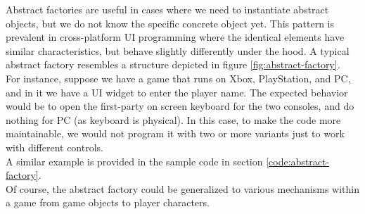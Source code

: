 \begin{multicols}{2}
Abstract factories are useful in cases where we need to instantiate abstract objects, but we do not know the specific concrete object yet\cite{sm-abstract-factory}. This pattern is prevalent in cross-platform UI programming where the identical elements have similar characteristics, but behave slightly differently under the hood. A typical abstract factory resembles a structure depicted in figure \ref{fig:abstract-factory}.\cite{ctan-abstract-factory}\bs
\\
For instance, suppose we have a game that runs on Xbox, PlayStation, and PC, and in it we have a UI widget to enter the player name. The expected behavior would be to open the first-party on screen keyboard for the two consoles, and do nothing for PC (as keyboard is physical). In this case, to make the code more maintainable, we would not program it with two or more variants just to work with different controls.\bs
\\
A similar example is provided in the sample code in section \ref{code:abstract-factory}\cite{sm-abstract-factory-example}.\bs
\\
Of course, the abstract factory could be generalized to various mechanisms within a game from game objects to player characters.\bs
\\

\iftwocolumns
\end{multicols}
\fi
